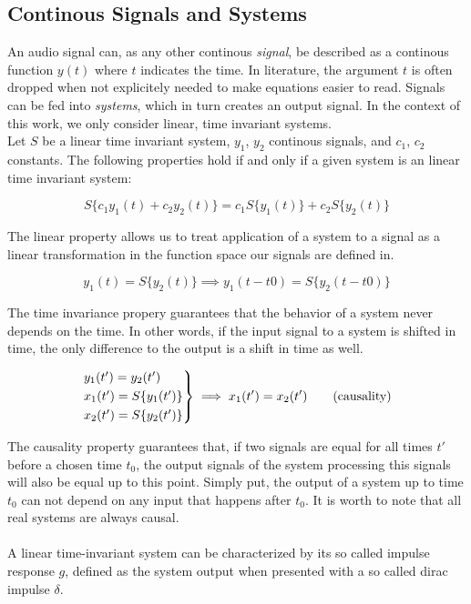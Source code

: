 \subsection{Continous Signals and Systems}

An audio signal can, as any other continous \textit{signal}, be described as a continous function $y(t)$ where $t$ indicates the time. In literature, the argument $t$ is often dropped  when not explicitely needed to make equations easier to read.  
Signals can be fed into \textit{systems}, which in turn creates an output signal. In the context of this work, we only consider linear, time invariant systems. 
\\
Let $S$ be a linear time invariant system, $y_1$, $y_2$ continous signals, and $c_1$, $c_2$ constants. The following properties hold if and only if a given system is an linear time invariant system: 

\[S\{c_1 y_1(t) + c_2 y_2(t)\} = c_1 S\{y_1(t)\} + c_2 S\{y_2(t)\} \tag{linearity}\]

The linear property allows us to treat application of a system to a signal as a linear transformation in the function space our signals are defined in. 

\[y_1(t) = S\{y_2(t)\} \implies y_1(t - t0) = S\{y_2(t - t0)\} \tag{time invariance}\]

The time invariance propery guarantees that the behavior of a system never depends on the time. In other words, if the input signal to a system is shifted in time, the only difference to the output is a shift in time as well.

\[
\begin{rcases*}
y_1(t') = y_2(t') \\
x_1(t') = S\{y_1(t')\} \\ 
x_2(t') = S\{y_2(t')\} \\
\end{rcases*} \implies x_1(t') = x_2(t') \tag{causality}\]

The causality property guarantees that, if two signals are equal for all times $t'$ before a chosen time $t_0$, the output signals of the system processing this signals will also be equal up to this point. Simply put, the output of a system up to time $t_0$ can not depend on any input that happens after $t_0$. It is worth to note that all real systems are always causal. 
\\ \\
A linear time-invariant system can be characterized by its so called impulse response $g$, defined as the system output when presented with a so called dirac impulse $\delta$.

